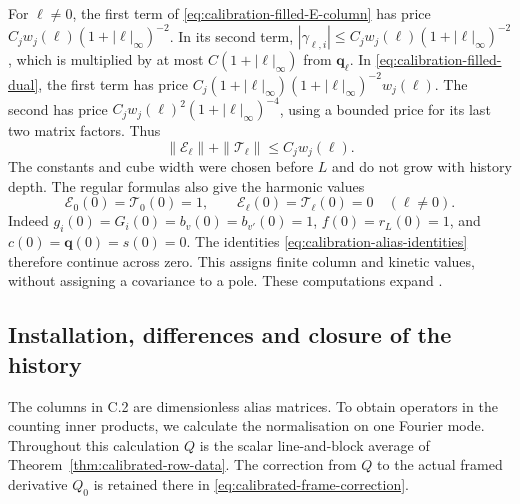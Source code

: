 \documentclass[11pt,reqno]{amsart}
\numberwithin{equation}{section}
\theoremstyle{definition}
\theoremstyle{remark}
\begin{document}
For \(\ell\ne0\), the first term of
\eqref{eq:calibration-filled-E-column} has price
\(C_jw_j(\ell)(1+|\ell|_\infty)^{-2}\).
In its second term,
\(|\gamma_{\ell,i}|\le C_jw_j(\ell)(1+|\ell|_\infty)^{-2}\),
which is multiplied by at most \(C(1+|\ell|_\infty)\)
from \(\mathbf q_\ell\). In
\eqref{eq:calibration-filled-dual}, the first term has price
\(C_j(1+|\ell|_\infty)(1+|\ell|_\infty)^{-2}w_j(\ell)\).
The second has price
\(C_jw_j(\ell)^2(1+|\ell|_\infty)^{-4}\), using a bounded
price for its last two matrix factors. Thus
\begin{equation}
                 \|\mathcal E_\ell\|+\|\mathcal T_\ell\|
                                                   \le C_jw_j(\ell).
 \label{eq:calibration-column-alias-price}
\end{equation}
The constants and cube width were chosen before \(L\) and
do not grow with history depth. The regular formulas also
give the harmonic values
\begin{equation}
 \mathcal E_0(0)=\mathcal T_0(0)=1,\qquad
           \mathcal E_\ell(0)=\mathcal T_\ell(0)=0\quad(\ell\ne0).
 \label{eq:calibration-harmonic-columns}
\end{equation}
Indeed \(g_i(0)=G_i(0)=b_v(0)=b_{v'}(0)=1\),
\(f(0)=r_L(0)=1\), and \(c(0)=\mathbf q(0)=s(0)=0\).
The identities \eqref{eq:calibration-alias-identities}
therefore continue across zero. This assigns finite column
and kinetic values, without assigning a covariance to a pole.
These computations expand \cite[Sections~21.1--21.2,
Lemma~21.1 and Lemma~21.2, pp.~107--110]{Main}.

\subsection{Installation, differences and closure of the history}
\label{sec:calibration-installation}

The columns in C.2 are dimensionless alias matrices. To obtain
operators in the counting inner products, we calculate the
normalisation on one Fourier mode. Throughout this calculation
\(Q\) is the scalar line-and-block average of
Theorem~\ref{thm:calibrated-row-data}. The correction from
\(Q\) to the actual framed derivative \(Q_0\) is retained
there in \eqref{eq:calibrated-frame-correction}.
\end{document}
